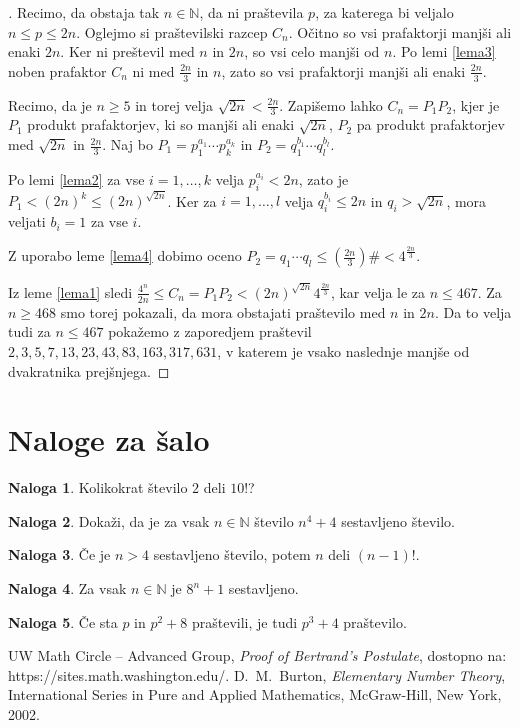 \documentclass[a4paper,12pt]{article}
\def\N{\mathbb{N}}
\theoremstyle{definition}
\newtheorem{naloga}{Naloga}
\theoremstyle{plain}
\newenvironment{dokaz}{\begin{proof}[\bfseries\upshape\proofname]}{\end{proof}}
\begin{document}
\begin{dokaz}
    Recimo, da obstaja tak $n \in \N$, da ni praštevila $p$, za katerega bi veljalo $n \leq p \leq 2n$. Oglejmo si praštevilski razcep $C_n$. Očitno so vsi prafaktorji manjši ali enaki $2n$. Ker ni preštevil med $n$ in $2n$, so vsi celo manjši od $n$. Po lemi \ref{lema3} noben prafaktor $C_n$ ni med $\frac{2n}{3}$ in $n$, zato so vsi prafaktorji manjši ali enaki $\frac{2n}{3}$.

    Recimo, da je $n \geq 5$ in torej velja $\sqrt{2n} < \frac{2n}{3}$. Zapišemo lahko $C_n = P_1 P_2$, kjer je $P_1$ produkt prafaktorjev, ki so manjši ali enaki $\sqrt{2n}$, $P_2$ pa produkt prafaktorjev med $\sqrt{2n}$ in $\frac{2n}{3}$. Naj bo $P_1 = p_1^{a_1} \cdots p_k^{a_k}$ in $P_2 = q_1^{b_1} \cdots q_l^{b_l}$. 
    
    Po lemi \ref{lema2} za vse $i = 1, \ldots, k$ velja $p_i^{a_i} < 2n$, zato je $P_1 < (2n)^k \leq (2n)^{\sqrt{2n}}$. Ker za $i = 1, \ldots, l$ velja $q_i^{b_i} \leq 2n$ in $q_i > \sqrt{2n}$, mora veljati $b_i = 1$ za vse $i$. 
    
    Z uporabo leme \ref{lema4} dobimo oceno $P_2 = q_1 \cdots q_l \leq (\frac{2n}{3})\# < 4^\frac{2n}{3}$. 
    
    Iz leme \ref{lema1} sledi $\frac{4^n}{2n} \leq C_n = P_1 P_2 < (2n)^{\sqrt{2n}} 4^{\frac{2n}{3}}$, kar velja le za $n \leq 467$. Za $n \geq 468$ smo torej pokazali, da mora obstajati praštevilo med $n$ in $2n$. Da to velja tudi za $n \leq 467$ pokažemo z zaporedjem praštevil $2, 3, 5, 7, 13, 23, 43, 83, 163, 317, 631$, v katerem je vsako naslednje manjše od dvakratnika prejšnjega.
\end{dokaz}



\section{Naloge za šalo}
\begin{naloga}
    Kolikokrat število $2$ deli $10!$?
\end{naloga}
\begin{naloga}
    Dokaži, da je za vsak $n \in \N$ število $n^4 + 4$ sestavljeno število.
\end{naloga}
\begin{naloga}
    Če je $n > 4$ sestavljeno število, potem $n$ deli $(n - 1)!$.
\end{naloga}
\begin{naloga}
    Za vsak $n \in \N$ je $8^n + 1$ sestavljeno.
\end{naloga}
\begin{naloga}
    Če sta $p$ in $p^2 + 8$ praštevili, je tudi $p^3 + 4$ praštevilo.
\end{naloga}



\begin{thebibliography}{1}
    UW Math Circle – Advanced Group, \emph{Proof of Bertrand’s Postulate}, dostopno na: https://sites.math.washington.edu/.
    D.~M.~Burton, \emph{Elementary Number Theory}, International Series in Pure and Applied Mathematics, McGraw-Hill, New York, 2002.
\end{thebibliography}
\end{document}
